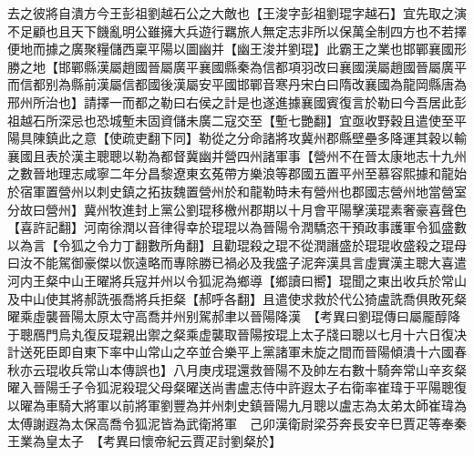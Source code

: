 去之彼將自潰方今王彭祖劉越石公之大敵也【王浚字彭祖劉琨字越石】宜先取之演不足顧也且天下饑亂明公雖擁大兵遊行羈旅人無定志非所以保萬全制四方也不若擇便地而據之廣聚糧儲西稟平陽以圖幽并【幽王浚并劉琨】此霸王之業也邯鄲襄國形勝之地【邯鄲縣漢屬趙國晉屬廣平襄國縣秦為信都項羽改曰襄國漢屬趙國晉屬廣平而信都别為縣前漢屬信都國後漢屬安平國邯鄲音寒丹宋白曰隋改襄國為龍岡縣唐為邢州所治也】請擇一而都之勒曰右侯之計是也遂進據襄國賓復言於勒曰今吾居此彭祖越石所深忌也恐城塹未固資儲未廣二寇交至【塹七艷翻】宜亟收野穀且遣使至平陽具陳鎮此之意【使疏吏翻下同】勒從之分命諸將攻冀州郡縣壁壘多降運其穀以輸襄國且表於漢主聰聰以勒為都督冀幽并營四州諸軍事【營州不在晉太康地志十九州之數晉地理志咸寧二年分昌黎遼東玄菟帶方樂浪等郡國五置平州至慕容熙據和龍始於宿軍置營州以刺史鎮之拓抜魏置營州於和龍勒時未有營州也郡國志營州地當營室分故曰營州】冀州牧進封上黨公劉琨移檄州郡期以十月會平陽擊漢琨素奢豪喜聲色【喜許記翻】河南徐潤以音律得幸於琨琨以為晉陽令潤驕恣干預政事護軍令狐盛數以為言【令狐之令力丁翻數所角翻】且勸琨殺之琨不從潤譖盛於琨琨收盛殺之琨母曰汝不能駕御豪傑以恢遠略而專除勝已禍必及我盛子泥奔漢具言虛實漢主聰大喜遣河内王粲中山王曜將兵寇并州以令狐泥為鄉導【鄉讀曰嚮】琨聞之東出收兵於常山及中山使其將郝詵張喬將兵拒粲【郝呼各翻】且遣使求救於代公猗盧詵喬俱敗死粲曜乘虛襲晉陽太原太守高喬并州别駕郝聿以晉陽降漢　【考異曰劉琨傳曰屬龎醇降于聰鴈門烏丸復反琨親出禦之粲乘虚襲取晉陽按琨上太子牋曰聰以七月十六日復决計送死臣即自東下率中山常山之卒並合樂平上黨諸軍未旋之間而晉陽傾潰十六國春秋亦云琨收兵常山本傳誤也】八月庚戌琨還救晉陽不及帥左右數十騎奔常山辛亥粲曜入晉陽壬子令狐泥殺琨父母粲曜送尚書盧志侍中許遐太子右衛率崔瑋于平陽聰復以曜為車騎大將軍以前將軍劉豐為并州刺史鎮晉陽九月聰以盧志為太弟太師崔瑋為太傅謝遐為太保高喬令狐泥皆為武衛將軍　己卯漢衛尉梁芬奔長安辛巳賈疋等奉秦王業為皇太子　【考異曰懷帝紀云賈疋討劉粲於】

